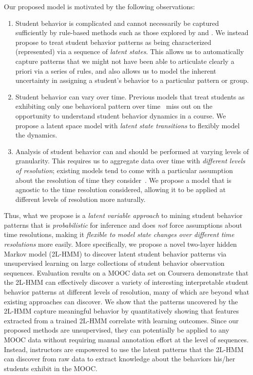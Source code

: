 Our proposed model is motivated by the following observations:
\begin{enumerate}
  \item Student behavior is complicated and cannot necessarily be captured
      sufficiently by rule-based methods such as those explored by
      \citet{Kizilcec:2013:LAK} and \citet{Davis:2016:EDM}. We instead
      propose to treat student behavior patterns as being characterized
      (represented) via a sequence of \emph{latent states}. This allows us
      to automatically capture patterns that we might not have been able to
      articulate clearly a priori via a series of rules, and also allows us
      to model the inherent uncertainty in assigning a student's behavior
      to a particular pattern or group.
  \item Student behavior can vary over time. Previous models that treat students
      as exhibiting only one behavioral pattern over
      time~\cite{Faucon:2016:EDM} miss out on the opportunity to understand
      student behavior dynamics in a course. We propose a latent space
      model with {\em latent state transitions} to flexibly model the
      dynamics.
  \item Analysis of student behavior can and should be performed at varying
      levels of granularity. This requires us to aggregate data over time
      with \emph{different levels of resolution}; existing models tend to come
      with a particular assumption about the resolution of time they
      consider~\cite{Faucon:2016:EDM, Kizilcec:2013:LAK, Shih:2010:EDM}. We
      propose a model that is agnostic to the time resolution considered,
      allowing it to be applied at different levels of resolution more
      naturally.
\end{enumerate}

Thus, what we propose is a \emph{latent variable approach} to mining student behavior
patterns that is \emph{probabilistic} for inference and
does \emph{not} force assumptions about time resolutions, making it
\emph{flexible to model state changes over different time resolutions} more
easily.  More specifically, we propose a novel two-layer hidden Markov
model (2L-HMM) to discover latent student behavior patterns via
unsupervised learning on large collections of student behavior observation
sequences.  Evaluation results on a MOOC data set on Coursera demonstrate
that the 2L-HMM can effectively discover a variety of interesting interpretable
student behavior patterns at different levels of resolution, many of which
are beyond what existing approaches can discover. We show that the patterns
uncovered by the 2L-HMM capture meaningful behavior by quantitatively
showing that features extracted from a trained 2L-HMM correlate with
learning outcomes. Since our proposed methods are
unsupervised, they can potentially be applied to any MOOC data without
requiring manual annotation effort at the level of sequences. Instead,
instructors are empowered to use the latent patterns that the 2L-HMM can
discover from raw data to extract knowledge about the behaviors his/her
students exhibit in the MOOC.
